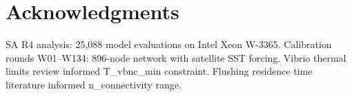 \documentclass[11pt,a4paper]{article}
\begin{document}
\section*{Acknowledgments}

SA R4 analysis: 25,088 model evaluations on Intel Xeon W-3365. Calibration rounds W01--W134: 896-node network with satellite SST forcing. Vibrio thermal limits review informed T\_vbnc\_min constraint. Flushing residence time literature informed n\_connectivity range.
\end{document}
